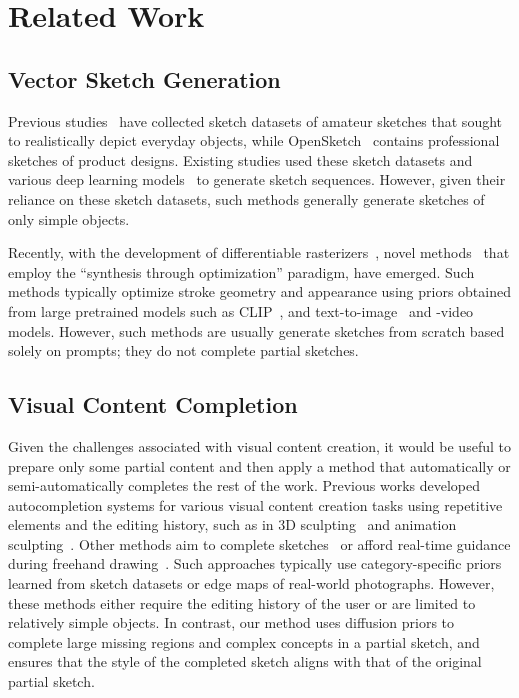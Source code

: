 
\section{Related Work}
\label{sec:related}
\subsection{Vector Sketch Generation}
Previous studies~\cite{eitz2012hdhso,ha2017neural,sketchy2016} have collected sketch datasets of amateur sketches that sought to realistically depict everyday objects, while OpenSketch~\cite{gryaditskaya2019opensketch} contains professional sketches of product designs.
Existing studies used these sketch datasets and various deep learning models~\cite{ha2017neural,lin2020sketch,ribeiro2020sketchformer,zhou2018learning} to generate sketch sequences.
However, given their reliance on these sketch datasets, such methods generally generate sketches of only simple objects.

Recently, with the development of differentiable rasterizers~\cite{Li:2020:DVG}, novel methods~\cite{vinker2022clipasso,vinker2023clipascene, xing2023diffsketcher,sketchVideo24} that employ the ``synthesis through optimization'' paradigm, have emerged.
Such methods typically optimize stroke geometry and appearance using priors obtained from large pretrained models such as CLIP~\cite{radford2021learning}, and text-to-image~\cite{rombach2022high} and -video~\cite{wang2023modelscope} models.
However, such methods are usually generate sketches from scratch based solely on prompts; they do not complete partial sketches.

\subsection{Visual Content Completion}
Given the challenges associated with visual content creation, it would be useful to prepare only some partial content and then apply a method that automatically or semi-automatically completes the rest of the work.
Previous works developed autocompletion systems for various visual content creation tasks using repetitive elements and the editing history, such as in 3D sculpting~\cite{peng2018autocomplete} and animation sculpting~\cite{peng2020autocomplete}.
Other methods aim to complete sketches~\cite{liu2019sketchgan} or afford real-time guidance during freehand drawing~\cite{lee2011shadowdraw}.
Such approaches typically use category-specific priors learned from sketch datasets or edge maps of real-world photographs.
However, these methods either require the editing history of the user or are limited to relatively simple objects.
In contrast, our method uses diffusion priors to complete large missing regions and complex concepts in a partial sketch, and ensures that the style of the completed sketch aligns with that of the original partial sketch.



